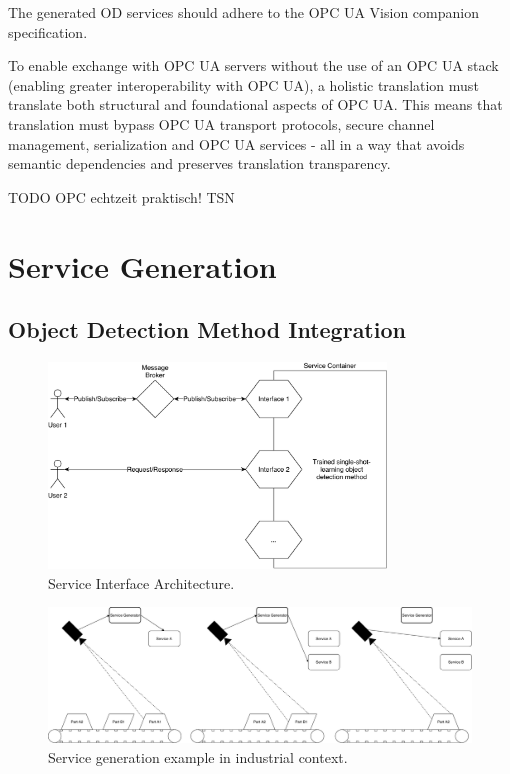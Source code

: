 The generated OD services should adhere to the OPC UA Vision companion specification. 

To enable exchange with OPC UA servers without the use of an OPC UA stack (enabling
greater interoperability with OPC UA), a holistic translation must translate both structural
and foundational aspects of OPC UA. This means that translation must bypass OPC UA
transport protocols, secure channel management, serialization and OPC UA services - all
in a way that avoids semantic dependencies and preserves translation transparency.

TODO OPC echtzeit praktisch! TSN
\section{Service Generation}
\subsection{Object Detection Method Integration}

\begin{figure}[ht]
    \centering
    \includegraphics[width=0.8\textwidth]{img/ServiceArchitecture.pdf}
    \caption{Service Interface Architecture.}
    \label{fig:ServiceInterArchit}
\end{figure}

\begin{figure}[ht]
    \centering
    \includegraphics[width=\textwidth]{img/ServiceGenerationExample.pdf}
    \caption{Service generation example in industrial context.}
    \label{fig:ServiceGenExa}
\end{figure}

